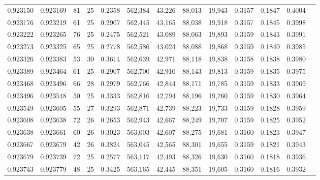 \begin{tabular}{rrrrrrrrrrrrr}
0.923150 & 0.923169 &    81 &  25 &                                     0.2358 & 562,384 &  43,226 &  88,013 &  19,943 & 0.3157 & 0.1847 & 0.4004 \\
0.923176 & 0.923219 &    61 &  25 &                                     0.2907 & 562,445 &  43,165 &  88,038 &  19,918 & 0.3157 & 0.1845 & 0.3998 \\
0.923222 & 0.923265 &    76 &  25 &                                     0.2475 & 562,521 &  43,089 &  88,063 &  19,893 & 0.3159 & 0.1843 & 0.3991 \\
0.923273 & 0.923325 &    65 &  25 &                                     0.2778 & 562,586 &  43,024 &  88,088 &  19,868 & 0.3159 & 0.1840 & 0.3985 \\
0.923326 & 0.923383 &    53 &  30 &                                     0.3614 & 562,639 &  42,971 &  88,118 &  19,838 & 0.3158 & 0.1838 & 0.3980 \\
0.923389 & 0.923464 &    61 &  25 &                                     0.2907 & 562,700 &  42,910 &  88,143 &  19,813 & 0.3159 & 0.1835 & 0.3975 \\
0.923468 & 0.923496 &    66 &  28 &                                     0.2979 & 562,766 &  42,844 &  88,171 &  19,785 & 0.3159 & 0.1833 & 0.3969 \\
0.923496 & 0.923548 &    50 &  25 &                                     0.3333 & 562,816 &  42,794 &  88,196 &  19,760 & 0.3159 & 0.1830 & 0.3964 \\
0.923549 & 0.923605 &    55 &  27 &                                     0.3293 & 562,871 &  42,739 &  88,223 &  19,733 & 0.3159 & 0.1828 & 0.3959 \\
0.923608 & 0.923638 &    72 &  26 &                                     0.2653 & 562,943 &  42,667 &  88,249 &  19,707 & 0.3159 & 0.1825 & 0.3952 \\
0.923638 & 0.923661 &    60 &  26 &                                     0.3023 & 563,003 &  42,607 &  88,275 &  19,681 & 0.3160 & 0.1823 & 0.3947 \\
0.923667 & 0.923679 &    42 &  26 &                                     0.3824 & 563,045 &  42,565 &  88,301 &  19,655 & 0.3159 & 0.1821 & 0.3943 \\
0.923679 & 0.923739 &    72 &  25 &                                     0.2577 & 563,117 &  42,493 &  88,326 &  19,630 & 0.3160 & 0.1818 & 0.3936 \\
0.923743 & 0.923779 &    48 &  25 &                                     0.3425 & 563,165 &  42,445 &  88,351 &  19,605 & 0.3160 & 0.1816 & 0.3932 \\

\end{tabular}
